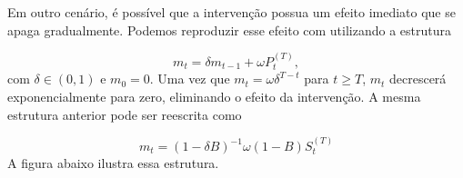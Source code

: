 \documentclass[
  letterpaper,
  DIV=11,
  numbers=noendperiod]{scrartcl}
\theoremstyle{plain}
\theoremstyle{plain}
\theoremstyle{definition}
\theoremstyle{definition}
\theoremstyle{remark}
\begin{document}
\begin{figure}

\begin{minipage}[t]{\linewidth}

{\centering 


}

\end{minipage}%

\end{figure}

Em outro cenário, é possível que a intervenção possua um efeito imediato
que se apaga gradualmente. Podemos reproduzir esse efeito com utilizando
a estrutura

\[m_t=\delta m_{t-1}+\omega P_{t}^{(T)},\] com \(\delta \in (0,1)\) e
\(m_0=0\). Uma vez que \(m_t=\omega \delta^{T-t}\) para \(t\geq T\),
\(m_t\) decrescerá exponencialmente para zero, eliminando o efeito da
intervenção. A mesma estrutura anterior pode ser reescrita como

\[m_t=(1-\delta B)^{-1}\omega (1-B)S^{(T)}_t\] A figura abaixo ilustra
essa estrutura.
\end{document}
